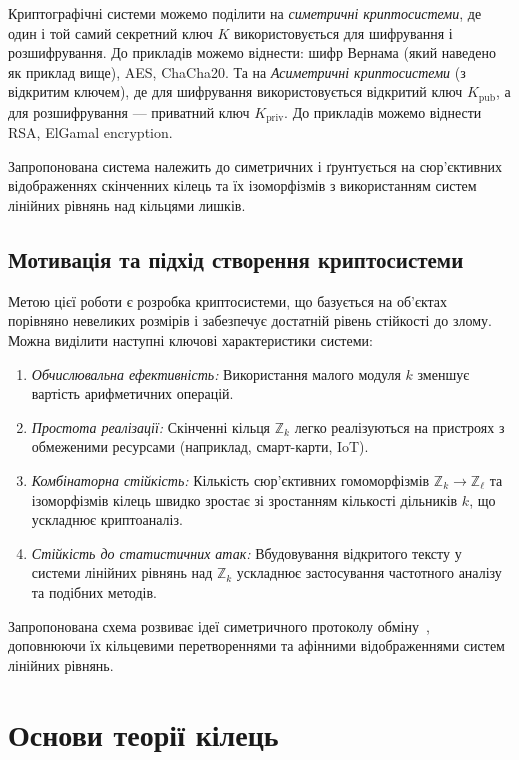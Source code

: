 Криптографічні системи можемо поділити на \emph{симетричні криптосистеми}, де один і той самий секретний ключ \(K\) використовується для шифрування і розшифрування.
До прикладів можемо віднести: шифр Вернама (який наведено як приклад вище), AES, ChaCha20.
Та на \emph{Асиметричні криптосистеми} (з відкритим ключем), де для шифрування використовується відкритий ключ \(K_{\text{pub}}\), а для розшифрування — приватний ключ \(K_{\text{priv}}\).
До прикладів можемо віднести RSA, ElGamal encryption.

Запропонована система належить до симетричних і ґрунтується на сюр'єктивних відображеннях скінченних кілець та їх ізоморфізмів з використанням систем лінійних рівнянь над кільцями лишків.

\subsection{Мотивація та підхід створення криптосистеми}
\label{subsec:motivation}

Метою цієї роботи є розробка криптосистеми, що базується на об'єктах порівняно невеликих розмірів і забезпечує достатній рівень стійкості до злому.
Можна виділити наступні ключові характеристики системи:

\begin{enumerate}
    \item \emph{Обчислювальна ефективність:} Використання малого модуля \(k\) зменшує вартість арифметичних операцій.
    \item \emph{Простота реалізації:} Скінченні кільця \(\mathbb{Z}_k\) легко реалізуються на пристроях з обмеженими ресурсами (наприклад, смарт-карти, IoT).
    \item \emph{Комбінаторна стійкість:} Кількість сюр'єктивних гомоморфізмів \(\mathbb{Z}_k \to \mathbb{Z}_\ell\) та ізоморфізмів кілець швидко зростає зі зростанням кількості дільників \(k\), що ускладнює криптоаналіз.
    \item \emph{Стійкість до статистичних атак:} Вбудовування відкритого тексту у системи лінійних рівнянь над \(\mathbb{Z}_k\) ускладнює застосування частотного аналізу та подібних методів.
\end{enumerate}

Запропонована схема розвиває ідеї симетричного протоколу обміну~\cite{KryvyiEtAl22}, доповнюючи їх кільцевими перетвореннями та афінними відображеннями систем лінійних рівнянь.


\section{Основи теорії кілець}
\label{sec:ring_theory}

